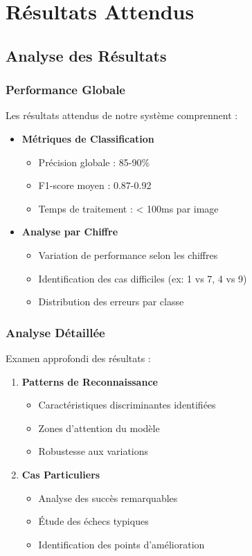 \chapter{Résultats Attendus}

\section{Analyse des Résultats}

\subsection{Performance Globale}
Les résultats attendus de notre système comprennent :

\begin{itemize}
    \item \textbf{Métriques de Classification}
    \begin{itemize}
        \item Précision globale : 85-90\%
        \item F1-score moyen : 0.87-0.92
        \item Temps de traitement : < 100ms par image
    \end{itemize}

    \item \textbf{Analyse par Chiffre}
    \begin{itemize}
        \item Variation de performance selon les chiffres
        \item Identification des cas difficiles (ex: 1 vs 7, 4 vs 9)
        \item Distribution des erreurs par classe
    \end{itemize}
\end{itemize}

\subsection{Analyse Détaillée}
Examen approfondi des résultats :

\begin{enumerate}
    \item \textbf{Patterns de Reconnaissance}
    \begin{itemize}
        \item Caractéristiques discriminantes identifiées
        \item Zones d'attention du modèle
        \item Robustesse aux variations
    \end{itemize}

    \item \textbf{Cas Particuliers}
    \begin{itemize}
        \item Analyse des succès remarquables
        \item Étude des échecs typiques
        \item Identification des points d'amélioration
    \end{itemize}
\end{enumerate}

